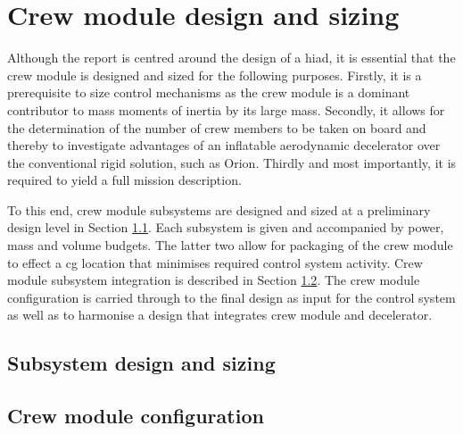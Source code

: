 \section{Crew module design and sizing}\label{ch:crewmod}
Although the report is centred around the design of a \acrfull{hiad}, it is essential that the crew module is designed and sized for the following purposes. Firstly, it is a prerequisite to size control mechanisms as the crew module is a dominant contributor to mass moments of inertia by its large mass. Secondly, it allows for the determination of the number of crew members to be taken on board and thereby to investigate advantages of an inflatable aerodynamic decelerator over the conventional rigid solution, such as Orion. Thirdly and most importantly, it is required to yield a full mission description.

To this end, crew module subsystems are designed and sized at a preliminary design level in Section \ref{sec:crewsubsys}. Each subsystem is given and accompanied by power, mass and volume budgets. The latter two allow for packaging of the crew module to effect a \gls{cg} location that minimises required control system activity. Crew module subsystem integration is described in Section \ref{sec:crewpackaging}. The crew module configuration is carried through to the final design as input for the control system as well as to harmonise a design that integrates crew module and decelerator.

\subsection{Subsystem design and sizing} \label{sec:crewsubsys}


\subsection{Crew module configuration} \label{sec:crewpackaging}


